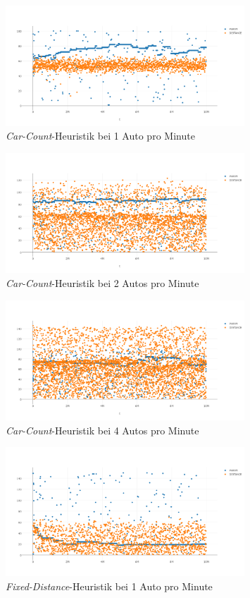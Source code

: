 \begin{figure}[H]
	\includegraphics[width=0.8\textwidth]{analyse/SingleMutant/carcount1.png}
	\caption{\emph{Car-Count}-Heuristik bei 1 Auto pro Minute}\label{fig:ap_sm_cc_1}
\end{figure}
\begin{figure}[H]
	\includegraphics[width=0.8\textwidth]{analyse/SingleMutant/carcount2.png}
	\caption{\emph{Car-Count}-Heuristik bei 2 Autos pro Minute}\label{fig:ap_sm_cc_2}
\end{figure}
\begin{figure}[H]
	\includegraphics[width=0.8\textwidth]{analyse/SingleMutant/carcount4.png}
	\caption{\emph{Car-Count}-Heuristik bei 4 Autos pro Minute}\label{fig:ap_sm_cc_4}
\end{figure}
\begin{figure}[H]
	\includegraphics[width=0.8\textwidth]{analyse/SingleMutant/fixeddistance1.png}
	\caption{\emph{Fixed-Distance}-Heuristik bei 1 Auto pro Minute}\label{fig:ap_sm_fd_1}
\end{figure}

